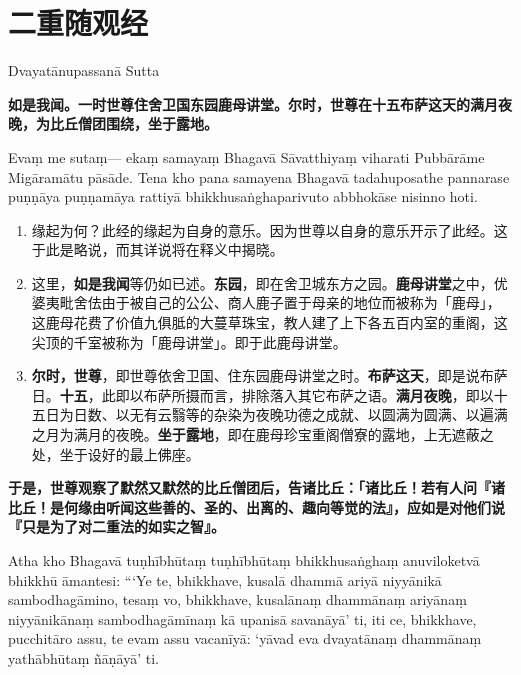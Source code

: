 \section{二重随观经}

\begin{center}Dvayatānupassanā Sutta\end{center}\vspace{1em}

\textbf{如是我闻。一时世尊住舍卫国东园鹿母讲堂。尔时，世尊在十五布萨这天的满月夜晚，为比丘僧团围绕，坐于露地。}

Evaṃ me sutaṃ— ekaṃ samayaṃ Bhagavā Sāvatthiyaṃ viharati Pubbārāme Migāramātu pāsāde. Tena kho pana samayena Bhagavā tadahuposathe pannarase puṇṇāya puṇṇamāya rattiyā bhikkhusaṅghaparivuto abbhokāse nisinno hoti.

\begin{enumerate}\item 缘起为何？此经的缘起为自身的意乐。因为世尊以自身的意乐开示了此经。这于此是略说，而其详说将在释义中揭晓。
\item 这里，\textbf{如是我闻}等仍如已述。\textbf{东园}，即在舍卫城东方之园。\textbf{鹿母讲堂}之中，优婆夷毗舍佉由于被自己的公公、商人鹿子置于母亲的地位而被称为「鹿母」，这鹿母花费了价值九俱胝的大蔓草珠宝，教人建了上下各五百内室的重阁，这尖顶的千室被称为「鹿母讲堂」。即于此鹿母讲堂。
\item \textbf{尔时，世尊}，即世尊依舍卫国、住东园鹿母讲堂之时。\textbf{布萨这天}，即是说布萨日。\textbf{十五}，此即以布萨所摄而言，排除落入其它布萨之语。\textbf{满月夜晚}，即以十五日为日数、以无有云翳等的杂染为夜晚功德之成就、以圆满为圆满、以遍满之月为满月的夜晚。\textbf{坐于露地}，即在鹿母珍宝重阁僧寮的露地，上无遮蔽之处，坐于设好的最上佛座。\end{enumerate}

\textbf{于是，世尊观察了默然又默然的比丘僧团后，告诸比丘：「诸比丘！若有人问『诸比丘！是何缘由听闻这些善的、圣的、出离的、趣向等觉的法』，应如是对他们说『只是为了对二重法的如实之智』。}

Atha kho Bhagavā tuṇhībhūtaṃ tuṇhībhūtaṃ bhikkhusaṅghaṃ anuviloketvā bhikkhū āmantesi: “‘Ye te, bhikkhave, kusalā dhammā ariyā niyyānikā sambodhagāmino, tesaṃ vo, bhikkhave, kusalānaṃ dhammānaṃ ariyānaṃ niyyānikānaṃ sambodhagāmīnaṃ kā upanisā savanāyā’ ti, iti ce, bhikkhave, pucchitāro assu, te evam assu vacanīyā: ‘yāvad eva dvayatānaṃ dhammānaṃ yathābhūtaṃ ñāṇāyā’ ti.

